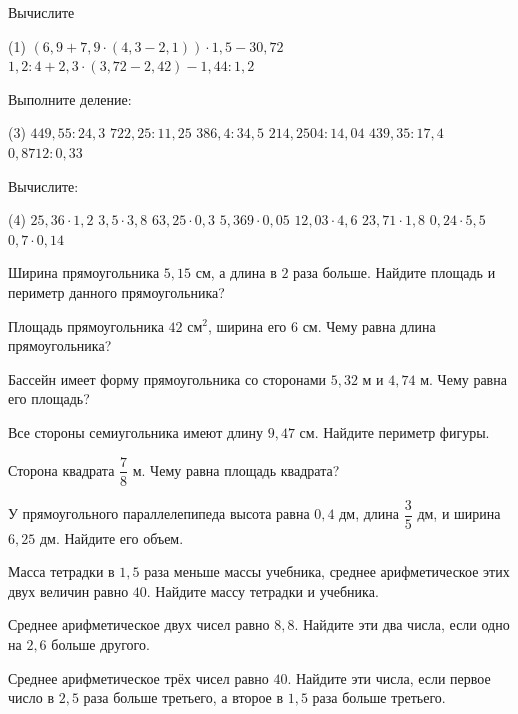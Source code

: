%
%

\begin{class}[number=1]
	\begin{listofex}
		\item Вычислите \begin{tasks}(1)
			\task \( (6,9+7,9\cdot(4,3-2,1))\cdot1,5-30,72 \)
			\task \( 1,2:4+2,3\cdot(3,72-2,42)-1,44:1,2 \)
		\end{tasks}
		\item Выполните деление:
		\begin{tasks}(3)
			\task \( 449,55: 24,3 \)
			\task \( 722,25:11,25 \) 
			\task \( 386,4:34,5 \)  
			\task \( 214,2504:14,04 \)  
			\task \( 439,35:17,4 \)  
			\task \( 0,8712:0,33 \)  
		\end{tasks}
		\item Вычислите:
		\begin{tasks}(4)
			\task \( 25,36\cdot1,2 \)
			\task \( 3,5\cdot3,8 \)
			\task \( 63,25\cdot0,3 \)
			\task \( 5,369\cdot0,05 \)
			\task \( 12,03\cdot4,6 \)
			\task \( 23,71\cdot1,8 \)
			\task \( 0,24\cdot5,5 \)
			\task \( 0,7\cdot0,14 \)
		\end{tasks}
		\item Ширина прямоугольника \( 5,15 \) см, а длина в \( 2 \) раза больше. Найдите площадь и периметр данного прямоугольника?
		\item Площадь прямоугольника \( 42 \) см\( ^{2} \), ширина его \( 6 \) см. Чему равна длина прямоугольника?
		\item Бассейн имеет форму прямоугольника со сторонами \( 5,32 \) м и \( 4,74 \) м. Чему равна его площадь?
		\item Все стороны семиугольника имеют длину \( 9,47 \) см. Найдите периметр фигуры.
		\item Сторона квадрата \( \dfrac{7}{8} \) м. Чему равна площадь квадрата?
		\item У прямоугольного параллелепипеда высота равна \( 0,4 \) дм, длина \( \dfrac{3}{5} \) дм, и ширина \( 6,25 \) дм. Найдите его объем.
		\item Масса тетрадки в \( 1,5 \) раза меньше массы учебника, среднее арифметическое этих двух величин равно \( 40 \). Найдите массу тетрадки и учебника.
		\item Среднее арифметическое двух чисел равно \( 8,8 \). Найдите эти два числа, если одно на \( 2,6 \) больше другого.
		\item Среднее арифметическое трёх чисел равно \( 40 \). Найдите эти числа, если первое число в \( 2,5 \) раза больше третьего, а второе в \( 1,5 \) раза больше третьего.
	\end{listofex}
\end{class}

